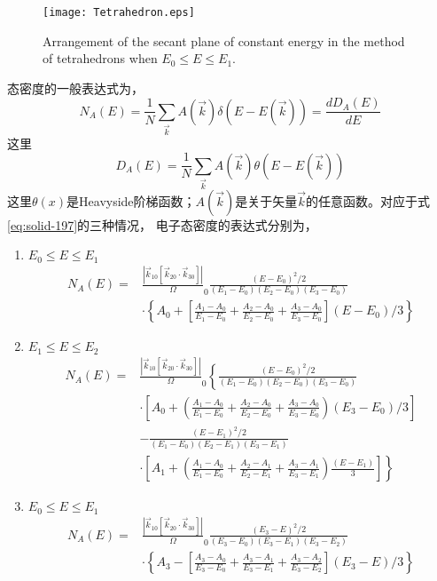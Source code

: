 \begin{figure}[!h]
\centering
 \texttt{[image: Tetrahedron.eps]}
\caption{\small Arrangement of the secant plane of constant energy in the method of tetrahedrons when $E_0\leqslant E\leqslant E_1$.}
\label{Tetrahedron}
\end{figure}

态密度的一般表达式为，
\begin{equation}
  N_A(E)=\frac1N\sum_{\vec k}A(\vec k)\delta(E-E(\vec k))=\frac{dD_A(E)}{dE}
  \label{eq:solid-198}
\end{equation}
这里
\begin{equation}
  D_A(E)=\frac1N\sum_{\vec k}A(\vec k)\theta(E-E(\vec k))
  \label{eq:solid-199}
\end{equation}
这里$\theta(x)$是Heavyside阶梯函数；$A(\vec k)$是关于矢量$\vec k$的任意函数。对应于式\eqref{eq:solid-197}的三种情况，
电子态密度的表达式分别为，
\begin{enumerate}
\item $E_0\leqslant E\leqslant E_1$
\begin{equation}
  \begin{split}
    N_A(E)=&\frac{|\vec k_{10}[\vec k_{20}\cdot\vec k_{30}]|}\Omega_0\frac{(E-E_0)^2/2}{(E_1-E_0)(E_2-E_0)(E_3-E_0)}\\
    &\cdot\left\{A_0+\left[\frac{A_1-A_0}{E_1-E_0}+\frac{A_2-A_0}{E_2-E_0}+\frac{A_3-A_0}{E_3-E_0}\right](E-E_0)/3\right\}
  \end{split}
  \label{eq:solid-200}
\end{equation}
\item $E_1\leqslant E\leqslant E_2$
\begin{equation}
  \begin{split}
    N_A(E)=&\frac{|\vec k_{10}[\vec k_{20}\cdot\vec k_{30}]|}\Omega_0\left\{\frac{(E-E_0)^2/2}{(E_1-E_0)(E_2-E_0)(E_3-E_0)}\right.\\
    &\cdot\left[A_0+\left(\frac{A_1-A_0}{E_1-E_0}+\frac{A_2-A_0}{E_2-E_0}+\frac{A_3-A_0}{E_3-E_0}\right)(E_3-E_0)/3\right]\\
    &-\frac{(E-E_1)^2/2}{(E_1-E_0)(E_2-E_1)(E_3-E_1)}\\
    &\cdot\left.\left[A_1+\left(\frac{A_1-A_0}{E_1-E_0}+\frac{A_2-A_1}{E_2-E_1}+\frac{A_3-A_1}{E_3-E_1}\right)\frac{(E-E_1)}3\right]\right\}
  \end{split}
  \label{eq:solid-201}
\end{equation}
\item $E_0\leqslant E\leqslant E_1$
\begin{equation}
  \begin{split}
    N_A(E)=&\frac{|\vec k_{10}[\vec k_{20}\cdot\vec k_{30}]|}\Omega_0\frac{(E_3-E)^2/2}{(E_3-E_0)(E_3-E_1)(E_3-E_2)}\\
    &\cdot\left\{A_3-\left[\frac{A_3-A_0}{E_3-E_0}+\frac{A_3-A_1}{E_3-E_1}+\frac{A_3-A_2}{E_3-E_2}\right](E_3-E)/3\right\}
  \end{split}
  \label{eq:solid-202}
\end{equation}
\end{enumerate}

